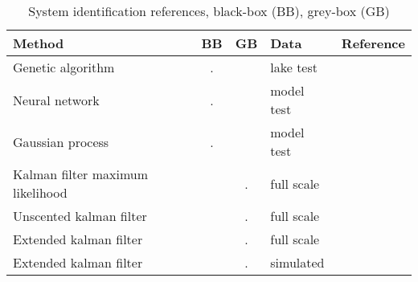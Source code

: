 \begin{table}
    \centering
    \footnotesize
    \caption{System identification references, black-box (BB), grey-box (GB)}
    \label{tab:references}
    
    \begin{tabular}{|p{4cm}|c|c|p{2cm}|p{5cm}|}
\hline


Method
&

BB
&

GB
&

Data
&

Reference
\\
\hline

Genetic algorithm
&
.
&&

lake test
&

\cite{miller_ship_2021}
\\

Neural network
&

.
&&

model test
&

\cite{he_nonparametric_2022}
\\


Gaussian process
&

.
&&

model test
&

\cite{xue_identification_2021}

\\

Kalman filter maximum likelihood
&&

.
&

full scale
&

\cite{astrom_identification_1976}
\\


Unscented kalman filter
&&

.
&

full scale
&

\cite{revestido_herrero_two-step_2012}
\\


Extended kalman filter
&&

.
&

full scale
&

\cite{perera_system_2015}
\\


Extended kalman filter
&&

.
&

simulated
&

\cite{shi_identification_2009}
\\



\end{tabular}
\end{table}
